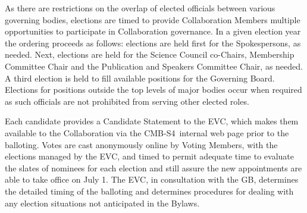 \documentclass[12pt]{article}
\newcommand\collabname{CMB-S4}
\begin{document}
As there are restrictions on the overlap of elected officials between various governing bodies, elections are timed to provide Collaboration Members multiple opportunities to participate in Collaboration governance. 
In a given election year the ordering proceeds as follows: elections are held first for the Spokespersons, as needed. Next, elections are held for the Science Council co-Chairs, Membership Committee Chair and the Publication and Speakers Committee Chair, as needed.  A third election is held to fill available positions for the Governing Board.
Elections for positions outside the top levels of major bodies occur when required as such officials are not prohibited from serving other elected roles. 

Each candidate provides a Candidate Statement to the EVC, which makes them available to the Collaboration via the \collabname\  internal web page prior to the balloting.   Votes are cast anonymously online by Voting Members, with the elections managed by the EVC, and timed to permit adequate time to evaluate the slates of nominees for each election and still assure the new appointments are able to take office on July 1.  The EVC, in consultation with the GB,  determines the detailed timing of the balloting and determines procedures for dealing with any election situations not anticipated in the Bylaws.






\end{document}
